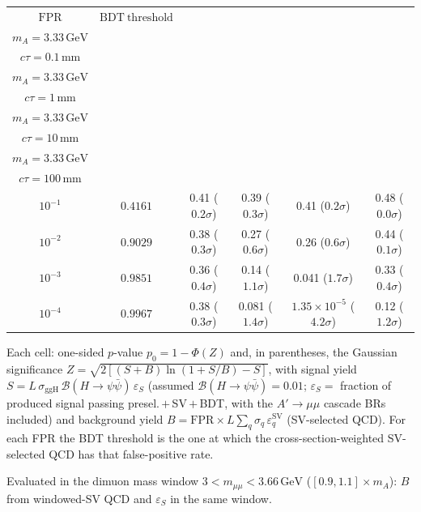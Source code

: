 \documentclass[10pt,a4paper]{article}
\begin{document}
{\begin{tabular}{cccccc}
\toprule
$\mathrm{FPR}$ & $\mathrm{BDT\ threshold}$ & \shortstack{$m_{\pi}=10\,\mathrm{GeV}$\\$m_{A}=3.33\,\mathrm{GeV}$\\$c\tau=0.1\,\mathrm{mm}$} & \shortstack{$m_{\pi}=10\,\mathrm{GeV}$\\$m_{A}=3.33\,\mathrm{GeV}$\\$c\tau=1\,\mathrm{mm}$} & \shortstack{$m_{\pi}=10\,\mathrm{GeV}$\\$m_{A}=3.33\,\mathrm{GeV}$\\$c\tau=10\,\mathrm{mm}$} & \shortstack{$m_{\pi}=10\,\mathrm{GeV}$\\$m_{A}=3.33\,\mathrm{GeV}$\\$c\tau=100\,\mathrm{mm}$} \\
\midrule
$10^{-1}$ & $0.4161$ & 0.41 ($0.2\sigma$) & 0.39 ($0.3\sigma$) & 0.41 ($0.2\sigma$) & 0.48 ($0.0\sigma$)\\
$10^{-2}$ & $0.9029$ & 0.38 ($0.3\sigma$) & 0.27 ($0.6\sigma$) & 0.26 ($0.6\sigma$) & 0.44 ($0.1\sigma$)\\
$10^{-3}$ & $0.9851$ & 0.36 ($0.4\sigma$) & 0.14 ($1.1\sigma$) & 0.041 ($1.7\sigma$) & 0.33 ($0.4\sigma$)\\
$10^{-4}$ & $0.9967$ & 0.38 ($0.3\sigma$) & 0.081 ($1.4\sigma$) & $1.35\times10^{-5}$ ($4.2\sigma$) & 0.12 ($1.2\sigma$)\\
\bottomrule
\end{tabular}

{\small Each cell: one-sided $p$-value $p_0=1-\Phi(Z)$ and, in parentheses, the Gaussian significance $Z=\sqrt{2\left[(S{+}B)\ln(1{+}S/B)-S\right]}$, with signal yield $S=L\,\sigma_{\mathrm{ggH}}\,\mathcal{B}(H\to\psi\bar{\psi})\,\varepsilon_S$ (assumed $\mathcal{B}(H\to\psi\bar{\psi})=0.01$; $\varepsilon_S=$ fraction of produced signal passing presel.\,$+$\,SV\,$+$\,BDT, with the $A'\to\mu\mu$ cascade BRs included) and background yield $B=\mathrm{FPR}\times L\sum_q\sigma_q\,\varepsilon_q^{\mathrm{SV}}$ (SV-selected QCD). For each FPR the BDT threshold is the one at which the cross-section-weighted SV-selected QCD has that false-positive rate.}

{\small Evaluated in the dimuon mass window $3<m_{\mu\mu}<3.66\,\mathrm{GeV}$ ($[0.9,1.1]\times m_A$): $B$ from windowed-SV QCD and $\varepsilon_S$ in the same window.}

}\clearpage
\end{document}

